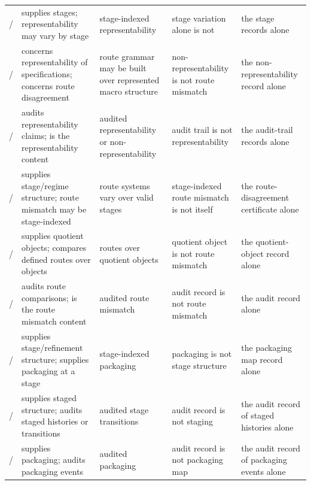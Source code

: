 \begin{longtable}{@{}>{\raggedright\arraybackslash}p{1.2cm}>{\raggedright\arraybackslash}p{4.3cm}>{\raggedright\arraybackslash}p{3.0cm}>{\raggedright\arraybackslash}p{3.0cm}>{\raggedright\arraybackslash}p{2.9cm}@{}}
\Ptwo{}/\Pfour{} & \Pfour{} supplies stages; \Ptwo{} representability may vary by stage & stage-indexed representability & stage variation alone is not \Ptwo{} & the \Pfour{} stage records alone \\
\Ptwo{}/\Pthree{} & \Ptwo{} concerns representability of specifications; \Pthree{} concerns route disagreement & route grammar may be built over represented macro structure & non-representability is not route mismatch & the \Ptwo{} non-representability record alone \\
\Ptwo{}/\Psix{} & \Psix{} audits representability claims; \Ptwo{} is the representability content & audited representability or non-representability & audit trail is not representability & the \Psix{} audit-trail records alone \\
\Pthree{}/\Pfour{} & \Pfour{} supplies stage/regime structure; \Pthree{} route mismatch may be stage-indexed & route systems vary over valid stages & stage-indexed route mismatch is not \Pfour{} itself & the \Pthree{} route-disagreement certificate alone \\
\Pthree{}/\Pfive{} & \Pfive{} supplies quotient objects; \Pthree{} compares defined routes over objects & routes over quotient objects & quotient object is not route mismatch & the \Pfive{} quotient-object record alone \\
\Pthree{}/\Psix{} & \Psix{} audits route comparisons; \Pthree{} is the route mismatch content & audited route mismatch & audit record is not route mismatch & the \Psix{} audit record alone \\
\Pfour{}/\Pfive{} & \Pfour{} supplies stage/refinement structure; \Pfive{} supplies packaging at a stage & stage-indexed packaging & packaging is not stage structure & the \Pfive{} packaging map record alone \\
\Pfour{}/\Psix{} & \Pfour{} supplies staged structure; \Psix{} audits staged histories or transitions & audited stage transitions & audit record is not staging & the \Psix{} audit record of staged histories alone \\
\Pfive{}/\Psix{} & \Pfive{} supplies packaging; \Psix{} audits packaging events & audited packaging & audit record is not packaging map & the \Psix{} audit record of packaging events alone \\
\end{longtable}
\endgroup
